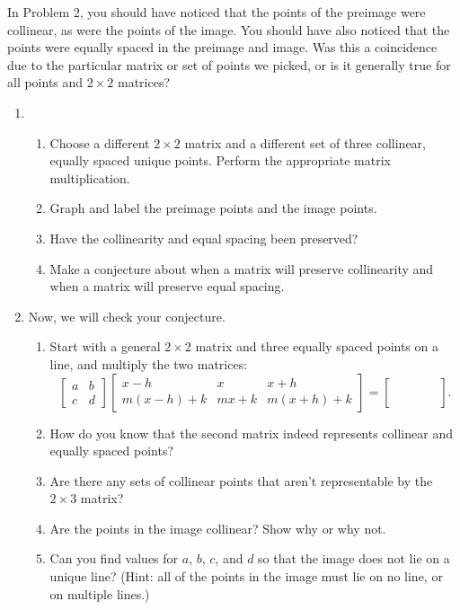 \documentclass[../gatm.tex]{subfiles}
\begin{document}
In Problem 2, you should have noticed that the points of the preimage were collinear, as were the points of the image. You should have also noticed that the points were equally spaced in the preimage and image. Was this a coincidence due to the particular matrix or set of points we picked, or is it generally true for all points and $2\times 2$ matrices?

\begin{enumerate}
\setcounter{enumi}{\value{mp_problem_i}}
\item \begin{enumerate}
\item Choose a different $2\times 2$ matrix and a different set of three collinear, equally spaced unique points. Perform the appropriate matrix multiplication.
\item Graph and label the preimage points and the image points.
\item Have the collinearity and equal spacing been preserved?
\item Make a conjecture about when a matrix will preserve collinearity and when a matrix will preserve equal spacing.
\end{enumerate}
\item Now, we will check your conjecture.
\begin{enumerate}
\item Start with a general $2\times 2$ matrix and three equally spaced points on a line, and multiply the two matrices:
$$\left[\begin{array}{cc}a & b \\ c & d\end{array}\right]
\left[\begin{array}{ccc}x-h & x & x+h \\ m(x-h)+k & mx+k & m(x+h)+k\end{array}\right]=
\left[\begin{array}{ccc}\phantom{0} & \phantom{0} & \phantom{0} \\ \phantom{0} \end{array}\right].$$
\item How do you know that the second matrix indeed represents collinear and equally spaced points?
\item Are there any sets of collinear points that aren't representable by the $2\times 3$ matrix?
\item Are the points in the image collinear? Show why or why not.
\item Can you find values for $a$, $b$, $c$, and $d$ so that the image does not lie on a unique line? (Hint: all of the points in the image must lie on no line, or on multiple lines.)

\end{enumerate}
\end{enumerate}
\end{document}
